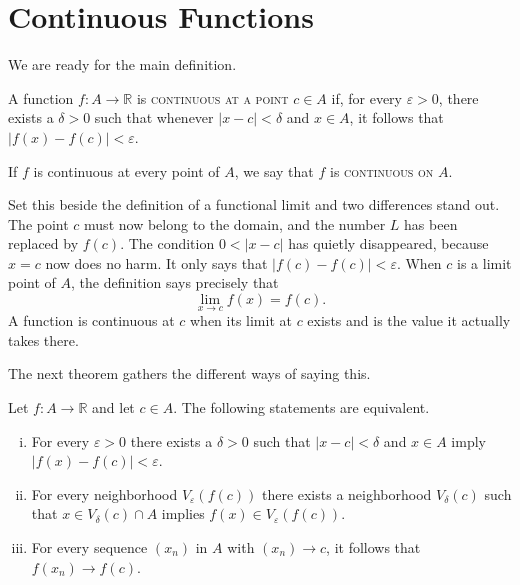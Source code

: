 \section{Continuous Functions}

We are ready for the main definition.

\begin{definition}\label{def:continuity}
A function $f : A \to \mathbb{R}$ is \textsc{continuous at a point} $c \in A$ if, for every $\varepsilon > 0$, there exists a $\delta > 0$ such that whenever $|x - c| < \delta$ and $x \in A$, it follows that $|f(x) - f(c)| < \varepsilon$.

If $f$ is continuous at every point of $A$, we say that $f$ is \textsc{continuous on} $A$.
\end{definition}

Set this beside the definition of a functional limit and two differences stand out.  The point $c$ must now belong to the domain, and the number $L$ has been replaced by $f(c)$.  The condition $0 < |x - c|$ has quietly disappeared, because $x = c$ now does no harm.  It only says that $|f(c) - f(c)| < \varepsilon$.  When $c$ is a limit point of $A$, the definition says precisely that
\[ \lim_{x \to c} f(x) = f(c). \]
A function is continuous at $c$ when its limit at $c$ exists and is the value it actually takes there.

The next theorem gathers the different ways of saying this.

\begin{theorem}\label{thm:continuity-characterizations}
Let $f : A \to \mathbb{R}$ and let $c \in A$.  The following statements are equivalent.
\begin{enumerate}[(i)]
	\item For every $\varepsilon > 0$ there exists a $\delta > 0$ such that $|x - c| < \delta$ and $x \in A$ imply $|f(x) - f(c)| < \varepsilon$.
	\item For every neighborhood $V_{\varepsilon}(f(c))$ there exists a neighborhood $V_{\delta}(c)$ such that $x \in V_{\delta}(c) \cap A$ implies $f(x) \in V_{\varepsilon}(f(c))$.
	\item For every sequence $(x_n)$ in $A$ with $(x_n) \to c$, it follows that $f(x_n) \to f(c)$.
\end{enumerate}
\end{theorem}

